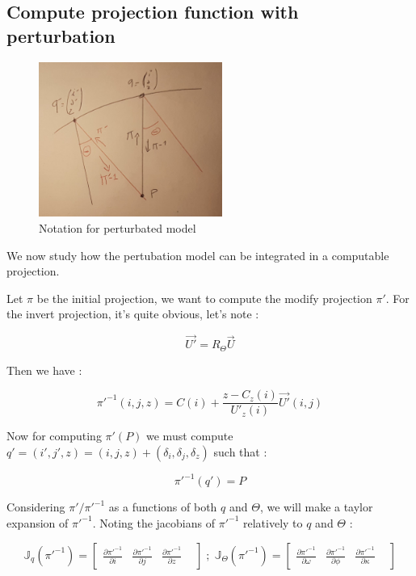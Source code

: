 
\subsection{Compute projection function with perturbation}

\begin{figure}
\centering
\includegraphics[width=6cm]{Methods/Images/PushB2.jpg}\caption{Notation for perturbated model}
        \label{fig:PushB2}
\end{figure}

We now study how the pertubation model can be integrated in a
computable projection.

Let $\pi$ be the initial projection, we want to compute the modify
projection $\pi'$.
For the invert projection, it's quite obvious, let's note  :

\begin{equation}
    \vec{U'} =  R_\Theta \vec{U}
\end{equation}

Then we have :

\begin{equation}
	\pi'^{-1}(i,j,z) = C(i) + \frac{z-C_z(i)}{U'_z(i)} \vec{U'}(i,j)
\end{equation}


Now for computing $\pi'(P)$ we must compute $q'=(i',j',z)=(i,j,z)+(\delta_i,\delta_j,\delta_z)$ such that :

\begin{equation}
        \pi'^{-1}(q') = P
\end{equation}

Considering $\pi'/\pi'^{-1}$ as a functions of both $q$ and $\Theta$,  we will make a taylor expansion 
of $\pi'^{-1}$. Noting  the jacobians of $\pi'^{-1}$ relatively to $q$ and $\Theta$ :

\begin{equation}
	\mathbb{J}_q(\pi'^{-1}) =
\begin{bmatrix}
       \frac{\partial \pi'^{-1}}{\partial i } &
       \frac{\partial \pi'^{-1}}{\partial j } &
       \frac{\partial \pi'^{-1}}{\partial z } &
\end{bmatrix}
   \; ; \;
      \mathbb{J}_\Theta(\pi'^{-1}) =
\begin{bmatrix}
       \frac{\partial \pi'^{-1}}{\partial \omega } &
       \frac{\partial \pi'^{-1}}{\partial \phi } &
       \frac{\partial \pi'^{-1}}{\partial \kappa } &
\end{bmatrix}
\end{equation}

